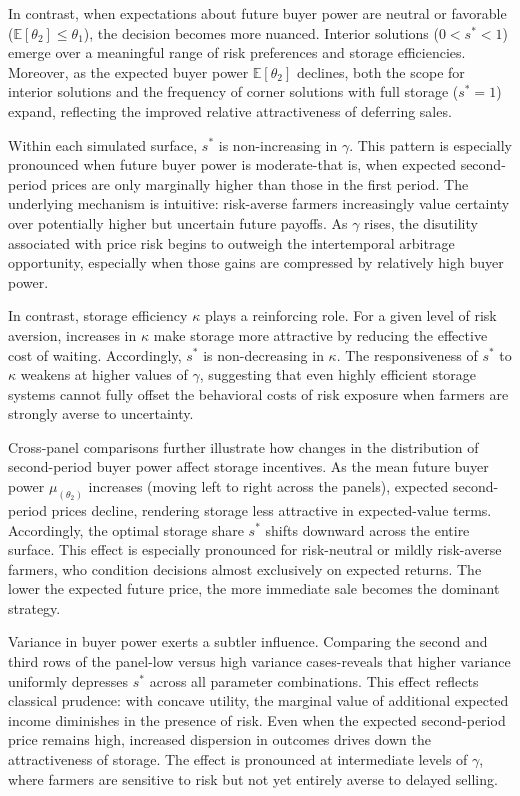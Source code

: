 In contrast, when expectations about future buyer power are neutral or favorable ($\mathbb{E}[\theta_2] \leq \theta_1$), the decision becomes more nuanced. Interior solutions ($0 < s^* < 1$) emerge over a meaningful range of risk preferences and storage efficiencies. Moreover, as the expected buyer power $\mathbb{E}[\theta_2]$ declines, both the scope for interior solutions and the frequency of corner solutions with full storage ($s^* = 1$) expand, reflecting the improved relative attractiveness of deferring sales.



Within each simulated surface, $s^*$ is non-increasing in $\gamma$. This pattern is especially pronounced when future buyer power is moderate-that is, when expected second-period prices are only marginally higher than those in the first period. The underlying mechanism is intuitive: risk-averse farmers increasingly value certainty over potentially higher but uncertain future payoffs. As $\gamma$ rises, the disutility associated with price risk begins to outweigh the intertemporal arbitrage opportunity, especially when those gains are compressed by relatively high buyer power.



In contrast, storage efficiency $\kappa$ plays a reinforcing role. For a given level of risk aversion, increases in $\kappa$ make storage more attractive by reducing the effective cost of waiting. Accordingly, $s^*$ is non-decreasing in $\kappa$. The responsiveness of $s^*$ to $\kappa$ weakens at higher values of $\gamma$, suggesting that even highly efficient storage systems cannot fully offset the behavioral costs of risk exposure when farmers are strongly averse to uncertainty. 


Cross-panel comparisons further illustrate how changes in the distribution of second-period buyer power affect storage incentives. As the mean future buyer power $\mu_{(\theta_2)}$ increases (moving left to right across the panels), expected second-period prices decline, rendering storage less attractive in expected-value terms. Accordingly, the optimal storage share $s^*$ shifts downward across the entire surface. This effect is especially pronounced for risk-neutral or mildly risk-averse farmers, who condition decisions almost exclusively on expected returns. The lower the expected future price, the more immediate sale becomes the dominant strategy.



Variance in buyer power exerts a subtler influence. Comparing the second and third rows of the panel-low versus high variance cases-reveals that higher variance uniformly depresses $s^*$ across all parameter combinations. This effect reflects classical prudence: with concave utility, the marginal value of additional expected income diminishes in the presence of risk. Even when the expected second-period price remains high, increased dispersion in outcomes drives down the attractiveness of storage. The effect is pronounced at intermediate levels of $\gamma$, where farmers are sensitive to risk but not yet entirely averse to delayed selling.


